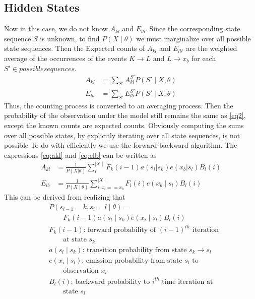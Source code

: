 \documentclass[11pt,letterpaper]{article}
\begin{document}
\subsection{Hidden States}
Now in this case, we do not know $A_{kl}$ and $E_{lb}$. Since the corresponding
state sequence $S$ is unknown, to find $P(X\mid \theta)$ we must marginalize
over all possible state sequences. Then the Expected counts of $A_{kl}$ and
$E_{lb'}$ are the weighted average of the occurrences of the events
$K \rightarrow L$ and $L \rightarrow x_b$ for each $S' \in possible sequences$.
\begin{align}
A_{kl} &= \sum_{S'} A^{S'}_{kl} P(S' \mid X, \theta)\label{eq:akl}\\
E_{lb} &= \sum_{S'} E^{S'}_{lb} P(S' \mid X, \theta)\label{eq:elb}
\end{align}
Thus, the counting process is converted to an averaging process. Then the
probability of the observation under the model still remains the same as
\eqref{eq2}, except the known counts are expected counts. Obviously computing
the sums over all possible states, by explicitly iterating over all state sequences, is not possible
To do with efficiently we use the
forward-backward algorithm. The expressions \eqref{eq:akl} and \eqref{eq:elb}
can be written as
\begin{align}
A_{kl} &= \frac{1}{P(X|\theta)} \sum_i^{\mid X \mid}
F_k(i-1)a(s_l|s_k)e(x_b|s_l) B_l(i) \label{eq:aklfb}\\
E_{lb} &= \frac{1}{P(X\mid \theta)} \sum_{i,x_i == x_b}^{\mid X \mid}
F_l(i)e(x_b  \mid s_l)B_l(i) \label{eq:elbfb}
\end{align}
This can be derived from realizing that 
\begin{align*}
& P(s_{i-1} = k, s_i = l \mid \theta) = \\
& \quad\quad F_k(i-1)a(s_l \mid
s_k)e(x_i \mid s_l)B_l(i)\\
& F_k(i-1) \text{: forward probability of $(i-1)^{th}$ iteration}\\ &\quad\quad \text{at state $s_k$}\\
& a(s_l \mid s_k) \text{: transition probability from state $s_k \rightarrow s_l$}\\
& e(x_i \mid s_l) \text{: emission probability from state $s_l$ to}\\ &\quad\quad \text{observation $x_i$}\\
& B_l(i) \text{: backward probability to $i^{th}$ time iteration at}\\ &\quad\quad \text{state $s_l$}
\end{align*}
\end{document}
